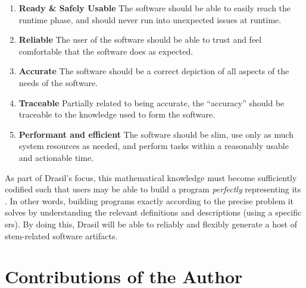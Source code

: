 \begin{enumerate}

      \item \textbf{Ready \& Safely Usable} The software should be able to
            easily reach the runtime phase, and should never run into unexpected
            issues at runtime.

      \item \textbf{Reliable} The user of the software should be able to trust
            and feel comfortable that the software does as expected.

      \item \textbf{Accurate} The software should be a correct depiction of all
            aspects of the needs of the software.

      \item \textbf{Traceable} Partially related to being accurate, the
            ``accuracy'' should be traceable to the knowledge used to form the
            software.

      \item \textbf{Performant and efficient} The software should be slim, use
            only as much system resources as needed, and perform tasks within a
            reasonably usable and actionable time.

\end{enumerate}

As part of Drasil's focus, this mathematical knowledge must become sufficiently
codified such that users may be able to build a program \textit{perfectly}
representing its . In other words, building programs exactly according
to the precise problem it solves by understanding the relevant definitions and
descriptions (using a specific \acs{srs}). By doing this, Drasil will be able to
reliably and flexibly generate a host of \acs{stem}-related software artifacts.

\section{Contributions of the Author}
\label{sec:intro:contributions}


